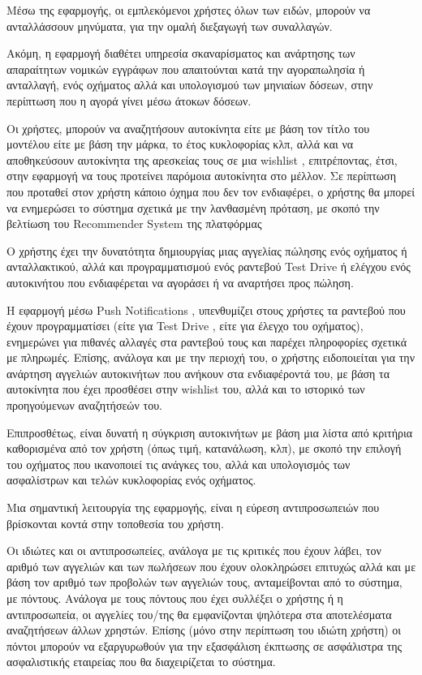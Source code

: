 \documentclass{../ol-softwaremanual}
\begin{document}
	Μέσω της εφαρμογής, οι εμπλεκόμενοι χρήστες όλων των ειδών, μπορούν να ανταλλάσσουν μηνύματα, για την ομαλή διεξαγωγή των συναλλαγών. \break
	
	Ακόμη, η εφαρμογή διαθέτει υπηρεσία σκαναρίσματος και ανάρτησης των απαραίτητων νομικών εγγράφων που απαιτούνται κατά την αγοραπωλησία ή ανταλλαγή, ενός οχήματος αλλά και υπολογισμού των μηνιαίων δόσεων, στην περίπτωση που η αγορά γίνει μέσω άτοκων δόσεων. \break
	
	Οι χρήστες, μπορούν να αναζητήσουν αυτοκίνητα είτε με βάση τον τίτλο του μοντέλου είτε με βάση την μάρκα, το έτος κυκλοφορίας κλπ, αλλά και να αποθηκεύσουν αυτοκίνητα της αρεσκείας τους σε μια \en wishlist \gr, επιτρέποντας, έτσι, στην εφαρμογή να τους προτείνει παρόμοια αυτοκίνητα στο μέλλον. Σε περίπτωση που προταθεί στον χρήστη κάποιο όχημα που δεν τον ενδιαφέρει, ο χρήστης θα μπορεί να ενημερώσει το σύστημα σχετικά με την λανθασμένη πρόταση, με σκοπό την βελτίωση του \en Recommender System \gr της πλατφόρμας \break 
	
	Ο χρήστης έχει την δυνατότητα δημιουργίας μιας αγγελίας πώλησης ενός οχήματος ή ανταλλακτικού, αλλά και προγραμματισμού ενός ραντεβού \en Test Drive \gr ή ελέγχου ενός αυτοκινήτου που ενδιαφέρεται να αγοράσει ή να αναρτήσει προς πώληση. \break
	
	Η εφαρμογή μέσω \en Push Notifications \gr, υπενθυμίζει στους χρήστες τα ραντεβού που έχουν προγραμματίσει (είτε για \en Test Drive \gr, είτε για έλεγχο του οχήματος), ενημερώνει για πιθανές αλλαγές στα ραντεβού τους και παρέχει πληροφορίες σχετικά με πληρωμές. Επίσης, ανάλογα και με την περιοχή του, ο χρήστης ειδοποιείται για την ανάρτηση αγγελιών αυτοκινήτων που ανήκουν στα ενδιαφέροντά του, με βάση τα αυτοκίνητα που έχει προσθέσει στην \en wishlist \gr του, αλλά και το ιστορικό των προηγούμενων αναζητήσεών του. \break
	
	Επιπροσθέτως, είναι δυνατή η σύγκριση αυτοκινήτων με βάση μια λίστα από κριτήρια καθορισμένα από τον χρήστη (όπως τιμή, κατανάλωση, κλπ), με σκοπό την επιλογή του οχήματος που ικανοποιεί τις ανάγκες του, αλλά και υπολογισμός των ασφαλίστρων και τελών κυκλοφορίας ενός οχήματος. \break
	
	Μια σημαντική λειτουργία της εφαρμογής, είναι η εύρεση αντιπροσωπειών που βρίσκονται κοντά στην τοποθεσία του χρήστη. \break
	
	Οι ιδιώτες και οι αντιπροσωπείες, ανάλογα με τις κριτικές που έχουν λάβει, τον αριθμό των αγγελιών και των πωλήσεων που έχουν ολοκληρώσει επιτυχώς αλλά και με βάση τον αριθμό των προβολών των αγγελιών τους, ανταμείβονται από το σύστημα, με πόντους. Ανάλογα με τους πόντους που έχει συλλέξει ο χρήστης ή η αντιπροσωπεία, οι αγγελίες του/της θα εμφανίζονται ψηλότερα στα αποτελέσματα αναζητήσεων άλλων χρηστών. Επίσης (μόνο στην περίπτωση του ιδιώτη χρήστη) οι πόντοι μπορούν να εξαργυρωθούν για την εξασφάλιση έκπτωσης σε ασφάλιστρα της ασφαλιστικής εταιρείας που θα διαχειρίζεται το σύστημα. \break
	
\end{document}
